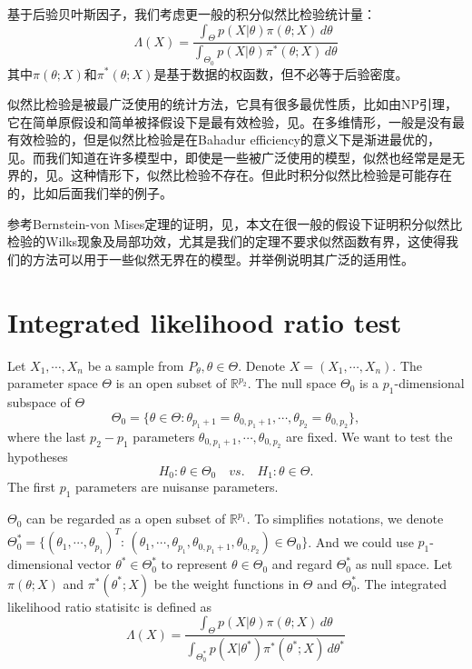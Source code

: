 \documentclass[review]{elsarticle}
\begin{document}
基于后验贝叶斯因子，我们考虑更一般的积分似然比检验统计量：
\begin{equation}
    \Lambda (X)=\frac{\int_{\Theta} p(X|\theta)\pi(\theta;X)\,d\theta}{\int_{\Theta_0} p(X|\theta)\pi^*(\theta;X)\,d\theta}
\end{equation}
其中$\pi(\theta;X)$和$\pi^*(\theta;X)$是基于数据的权函数，但不必等于后验密度。

似然比检验是被最广泛使用的统计方法，它具有很多最优性质，比如由NP引理，它在简单原假设和简单被择假设下是最有效检验，见\cite{Lehmann}。在多维情形，一般是没有最有效检验的，但是似然比检验是在Bahadur efficiency的意义下是渐进最优的，见\cite{MR0315820}。而我们知道在许多模型中，即使是一些被广泛使用的模型，似然也经常是是无界的，见\cite{Cam1990Maximum}。这种情形下，似然比检验不存在。但此时积分似然比检验是可能存在的，比如后面我们举的例子。

参考Bernstein-von Mises定理的证明，见\cite{van2000asymptotic}，本文在很一般的假设下证明积分似然比检验的Wilks现象及局部功效，尤其是我们的定理不要求似然函数有界，这使得我们的方法可以用于一些似然无界在的模型。并举例说明其广泛的适用性。

\section{Integrated likelihood ratio test}

Let $X_1,\cdots,X_n$ be a sample from $P_{\theta}, \theta\in\Theta$. Denote $X=(X_1,\cdots,X_n)$. The parameter space $\Theta$ is an open subset of $\mathbb{R}^{p_2}$. The null space $\Theta_0$ is a $p_1$-dimensional subspace of $\Theta$
\begin{equation}
    \Theta_0=\{\theta\in\Theta:\theta_{p_1+1}=\theta_{0,{p_1+1}},\cdots,\theta_{p_2}=\theta_{0,{p_2}}\},
\end{equation}
where the last $p_2-p_1$ parameters $\theta_{0,{p_1+1}},\cdots,\theta_{0,{p_2}}$ are fixed. We want to test the hypotheses
\begin{equation}
H_0:\theta\in \Theta_0\quad vs. \quad H_1:\theta\in \Theta.
\end{equation}
The first $p_1$ parameters are nuisanse parameters.

$\Theta_0$ can be regarded as a open subset of $\mathbb{R}^{p_1}$. To simplifies notations, we denote  $\Theta^*_0=\{(\theta_1,\cdots,\theta_{p_1})^T:\, (\theta_1,\cdots,\theta_{p_1},\theta_{0,p_1+1},\theta_{0,p_2})\in \Theta_0\}$. And we could use $p_1$-dimensional vector $\theta^*\in
\Theta_0^*$ to represent $\theta\in\Theta_0$ and regard $\Theta_0^*$ as null space.  Let $\pi(\theta;X)$ and $\pi^*(\theta^*;X)$ be the weight functions in $\Theta$ and $\Theta_0^*$. The integrated likelihood ratio statisitc is defined as
\begin{equation}\label{likelihoodRatio}
    \Lambda (X)=\frac{\int_{\Theta} p(X|\theta)\pi(\theta;X)\,d\theta}{\int_{\Theta^*_0} p(X|\theta^*)\pi^*(\theta^*;X)\,d\theta^*}
\end{equation}
\end{document}
